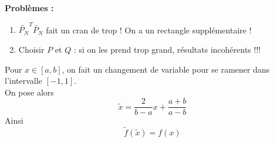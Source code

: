 \color{red}
\textbf{Problèmes :}
\begin{enumerate}
	\item $\widetilde{P_N}^T\widetilde{P_N}$ fait un cran de trop ! On a un rectangle supplémentaire !
	\item Choisir $P$ et $Q$ : si on les prend trop grand, résultats incohérents !!!
\end{enumerate}
\color{black}

\begin{Rem}
	Pour $x\in[a,b]$, on fait un changement de variable pour se ramener dans l'intervalle $[-1,1]$. \\
	On pose alors
	$$\tilde{x}=\frac{2}{b-a}x+\frac{a+b}{a-b}$$
	Ainsi
	$$\tilde{f}(\tilde{x})=f(x)$$
\end{Rem}
